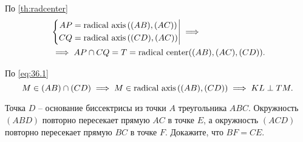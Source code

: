 \begin{tasks}
{            По \cref{th:radcenter}
            \begin{equation}\label{eq:36.1}
                \begin{aligned}
                    &\left\{\begin{aligned}
                            AP &= \operatorname{\text{radical axis}}\left((AB), (AC)\right) \\
                            CQ &= \operatorname{\text{radical axis}}\left( (CD), (AC) \right) 
                        \end{aligned}\right| \implies \\
                    &\implies AP \cap CQ = T = \operatorname{\text{radical center}}((AB), (AC), (CD)).
                \end{aligned}
            \end{equation} 

            По \cref{eq:36.1} 
            \begin{equation}
                M \in (AB) \cap (CD) \implies M \in \operatorname{\text{radical axis}}\left( (AB), (CD) \right) \implies KL \perp TM.
            \end{equation} 
        }
    \item Точка $D$ -- основание биссектрисы из точки $A$ треугольника $ABC$. Окружность $(ABD)$ повторно пересекает прямую $AC$ в точке $E$, а окружность $(ACD)$ повторно пересекает прямую $BC$ в точке $F$. Докажите, что $BF = CE$. 



\end{tasks}
